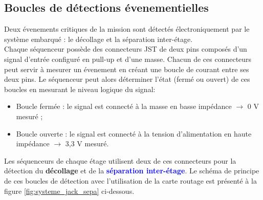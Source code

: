 \subsection{Boucles de détections évenementielles}

Deux évenements critiques de la mission sont détectés électroniquement par le système embarqué : le décollage et la séparation
inter-étage.\\

Chaque séquenceur possède des connecteurs JST de deux pins composés d'un signal d'entrée configuré en pull-up et d'une masse.
Chacun de ces connecteurs peut servir à mesurer un évenement en créant une boucle de courant entre ses deux pins. Le séquenceur
peut alors déterminer l'état (fermé ou ouvert) de ces boucles en mesurant le niveau logique du signal:
\begin{itemize}
    \item Boucle fermée : le signal est connecté à la masse en basse impédance $\longrightarrow$ 0 V mesuré ;
    \item Boucle ouverte : le signal est connecté à la tension d'alimentation en haute impédance $\longrightarrow$ 3,3 V mesuré.
\end{itemize}

\noindent Les séquenceurs de chaque étage utilisent deux de ces connecteurs pour la détection du \textcolor{green2}{
\textbf{décollage}} et de la \textcolor{blue}{\textbf{séparation inter-étage}}. Le schéma de principe de ces boucles de détection
avec l'utilisation de la carte routage est présenté à la figure \ref{fig:systeme_jack_sepa} ci-dessous.

\vspace{0.5cm}

